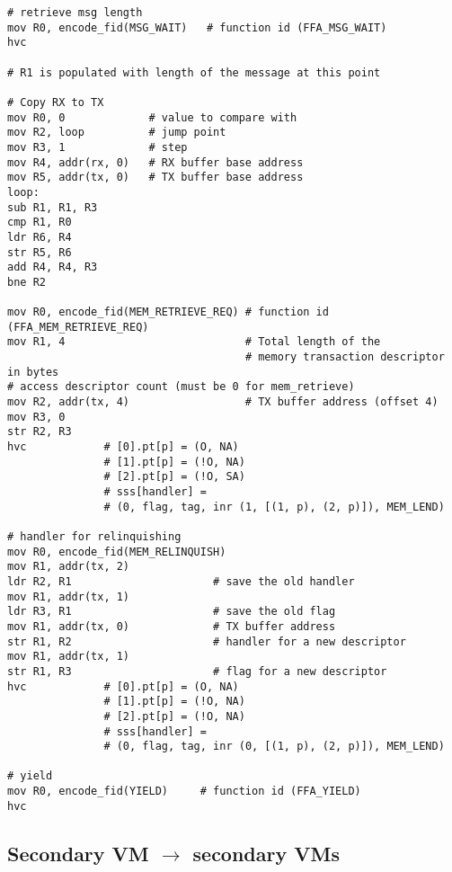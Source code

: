 \documentclass{article}
\begin{document}
\begin{lstlisting}[caption={VM 2}]
# retrieve msg length
mov R0, encode_fid(MSG_WAIT)   # function id (FFA_MSG_WAIT)
hvc

# R1 is populated with length of the message at this point

# Copy RX to TX
mov R0, 0             # value to compare with
mov R2, loop          # jump point
mov R3, 1             # step
mov R4, addr(rx, 0)   # RX buffer base address
mov R5, addr(tx, 0)   # TX buffer base address
loop:
sub R1, R1, R3
cmp R1, R0
ldr R6, R4
str R5, R6
add R4, R4, R3
bne R2

mov R0, encode_fid(MEM_RETRIEVE_REQ) # function id (FFA_MEM_RETRIEVE_REQ)
mov R1, 4                            # Total length of the  
                                     # memory transaction descriptor in bytes
# access descriptor count (must be 0 for mem_retrieve)
mov R2, addr(tx, 4)                  # TX buffer address (offset 4)
mov R3, 0
str R2, R3                                    
hvc            # [0].pt[p] = (O, NA)
               # [1].pt[p] = (!O, NA)
               # [2].pt[p] = (!O, SA)
               # sss[handler] = 
               # (0, flag, tag, inr (1, [(1, p), (2, p)]), MEM_LEND)

# handler for relinquishing
mov R0, encode_fid(MEM_RELINQUISH)
mov R1, addr(tx, 2)
ldr R2, R1                      # save the old handler
mov R1, addr(tx, 1)
ldr R3, R1                      # save the old flag
mov R1, addr(tx, 0)             # TX buffer address
str R1, R2                      # handler for a new descriptor
mov R1, addr(tx, 1)
str R1, R3                      # flag for a new descriptor
hvc            # [0].pt[p] = (O, NA)
               # [1].pt[p] = (!O, NA)
               # [2].pt[p] = (!O, NA)
               # sss[handler] = 
               # (0, flag, tag, inr (0, [(1, p), (2, p)]), MEM_LEND)

# yield
mov R0, encode_fid(YIELD)     # function id (FFA_YIELD)
hvc
\end{lstlisting}

\subsection{Secondary VM $\rightarrow$ secondary VMs}
\end{document}
